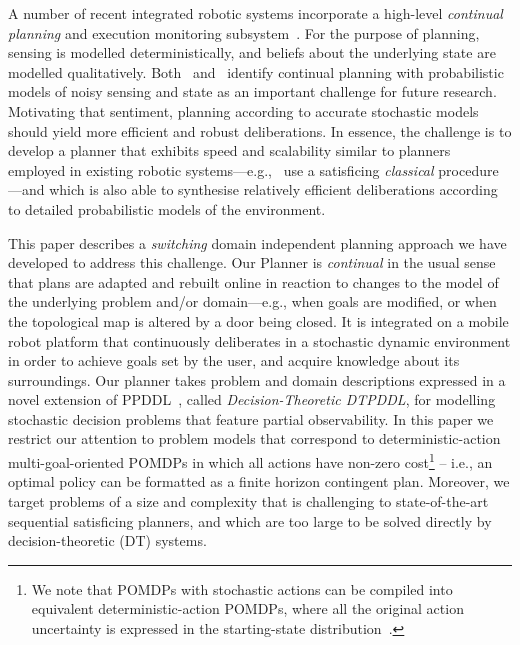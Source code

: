 



A number of recent integrated robotic systems incorporate a
high-level {\em continual planning} and execution monitoring
subsystem~\cite{wyattetal2010tamd,talamadupula:2010,Kraft2008}.
For the purpose of planning, sensing is modelled
deterministically, and beliefs about the underlying state are
modelled qualitatively.
Both~\citeauthor{talamadupula:2010} and~\citeauthor{wyattetal2010tamd}
identify
continual planning with probabilistic
models of noisy sensing and state as an important challenge for future
research.
Motivating that sentiment, planning according to accurate
stochastic models should yield more efficient and robust
deliberations.
In essence, the challenge is to develop a planner that
exhibits speed and scalability similar to planners employed in
existing robotic systems---e.g.,~\citeauthor{wyattetal2010tamd} use a
satisficing {\em classical} procedure---and which is also able to
synthesise relatively efficient deliberations according to detailed
probabilistic models of the environment.


This paper describes a {\em switching} domain independent planning
approach we have developed to address this challenge. 
Our Planner is {\em continual} in the usual sense that plans are
adapted and rebuilt online in reaction to changes to the model of the
underlying problem and/or domain---e.g., when goals are
modified, or when the topological map is altered by a door being
closed.
It is integrated on a mobile robot platform that continuously
deliberates in a stochastic dynamic environment in order to achieve
goals set by the user, and acquire knowledge about its surroundings.
Our planner takes problem and domain descriptions expressed in a novel
extension of PPDDL~\cite{younes:etal:2005}, called {\em
Decision-Theoretic DTPDDL}, for modelling stochastic decision problems
that feature partial observability.  In this paper we restrict our
attention to problem models that correspond to deterministic-action
multi-goal-oriented POMDPs in which all actions have non-zero
cost\footnote{We note that POMDPs with stochastic actions can be
compiled into equivalent deterministic-action POMDPs, where all the
original action uncertainty is expressed in the starting-state
distribution~\cite{ng:Jordan:2000}.} -- i.e., an optimal policy can be
formatted as a finite horizon contingent plan. Moreover, we target
problems of a size and complexity that is challenging to
state-of-the-art sequential satisficing planners, and which are too
large to be solved directly by decision-theoretic (DT) systems.


